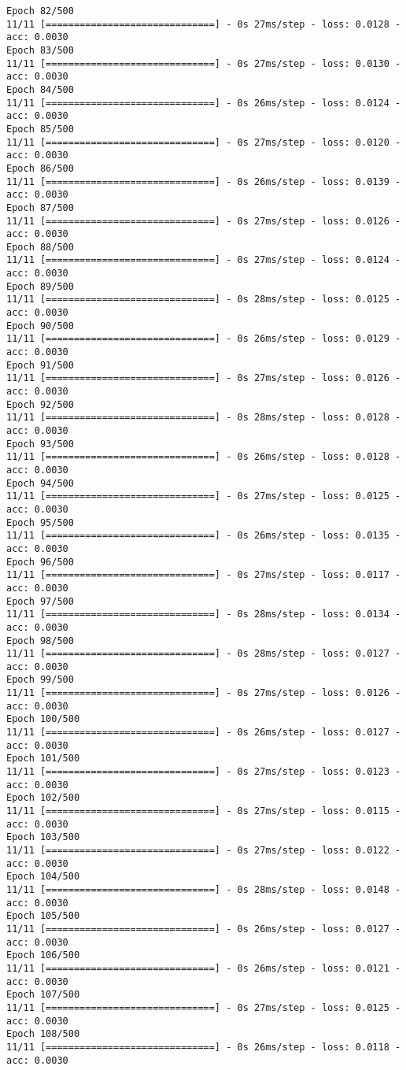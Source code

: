\documentclass[11pt]{article}
\begin{document}
\begin{Verbatim}[commandchars=\\\{\}]
Epoch 82/500
11/11 [==============================] - 0s 27ms/step - loss: 0.0128 - acc: 0.0030
Epoch 83/500
11/11 [==============================] - 0s 27ms/step - loss: 0.0130 - acc: 0.0030
Epoch 84/500
11/11 [==============================] - 0s 26ms/step - loss: 0.0124 - acc: 0.0030
Epoch 85/500
11/11 [==============================] - 0s 27ms/step - loss: 0.0120 - acc: 0.0030
Epoch 86/500
11/11 [==============================] - 0s 26ms/step - loss: 0.0139 - acc: 0.0030
Epoch 87/500
11/11 [==============================] - 0s 27ms/step - loss: 0.0126 - acc: 0.0030
Epoch 88/500
11/11 [==============================] - 0s 27ms/step - loss: 0.0124 - acc: 0.0030
Epoch 89/500
11/11 [==============================] - 0s 28ms/step - loss: 0.0125 - acc: 0.0030
Epoch 90/500
11/11 [==============================] - 0s 26ms/step - loss: 0.0129 - acc: 0.0030
Epoch 91/500
11/11 [==============================] - 0s 27ms/step - loss: 0.0126 - acc: 0.0030
Epoch 92/500
11/11 [==============================] - 0s 28ms/step - loss: 0.0128 - acc: 0.0030
Epoch 93/500
11/11 [==============================] - 0s 26ms/step - loss: 0.0128 - acc: 0.0030
Epoch 94/500
11/11 [==============================] - 0s 27ms/step - loss: 0.0125 - acc: 0.0030
Epoch 95/500
11/11 [==============================] - 0s 26ms/step - loss: 0.0135 - acc: 0.0030
Epoch 96/500
11/11 [==============================] - 0s 27ms/step - loss: 0.0117 - acc: 0.0030
Epoch 97/500
11/11 [==============================] - 0s 28ms/step - loss: 0.0134 - acc: 0.0030
Epoch 98/500
11/11 [==============================] - 0s 28ms/step - loss: 0.0127 - acc: 0.0030
Epoch 99/500
11/11 [==============================] - 0s 27ms/step - loss: 0.0126 - acc: 0.0030
Epoch 100/500
11/11 [==============================] - 0s 26ms/step - loss: 0.0127 - acc: 0.0030
Epoch 101/500
11/11 [==============================] - 0s 27ms/step - loss: 0.0123 - acc: 0.0030
Epoch 102/500
11/11 [==============================] - 0s 27ms/step - loss: 0.0115 - acc: 0.0030
Epoch 103/500
11/11 [==============================] - 0s 27ms/step - loss: 0.0122 - acc: 0.0030
Epoch 104/500
11/11 [==============================] - 0s 28ms/step - loss: 0.0148 - acc: 0.0030
Epoch 105/500
11/11 [==============================] - 0s 26ms/step - loss: 0.0127 - acc: 0.0030
Epoch 106/500
11/11 [==============================] - 0s 26ms/step - loss: 0.0121 - acc: 0.0030
Epoch 107/500
11/11 [==============================] - 0s 27ms/step - loss: 0.0125 - acc: 0.0030
Epoch 108/500
11/11 [==============================] - 0s 26ms/step - loss: 0.0118 - acc: 0.0030

\end{Verbatim}
\end{document}
